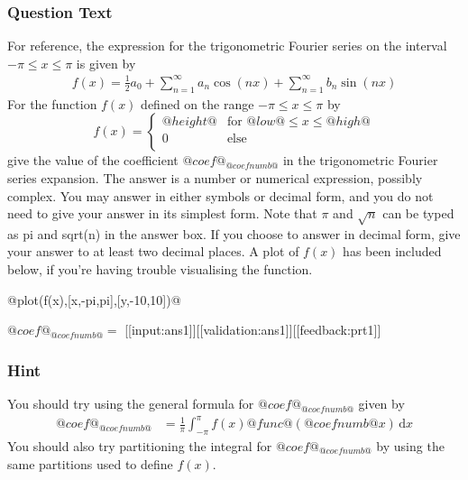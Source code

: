 \documentclass[a4paper,10pt]{article}
\begin{document}
\subsubsection{Question Text}
For reference, the expression for the trigonometric Fourier series on the interval $-\pi \leq x \leq \pi$ is given by \begin{align*}
f(x) = \frac{1}{2}a_0 + \sum_{n=1}^{\infty}a_n\cos(nx) + \sum_{n=1}^{\infty}b_n\sin(nx)
\end{align*}
For the function \(f(x)\) defined on the range \(-\pi \leq x \leq \pi\) by \[ f(x) = \begin{cases} @height@ & \text{for } @low@ \leq x \leq @high@\\ 0 & \text{else} \\ \end{cases} \] give the value of the coefficient \(@coef@_{@coefnumb@}\) in the trigonometric Fourier series expansion. The answer is a number or numerical expression, possibly complex. You may answer in either symbols or decimal form, and you do not need to give your answer in its simplest form. Note that \(\pi\) and \(\sqrt{n}\) can be typed as pi and sqrt(n) in the answer box. If you choose to answer in decimal form, give your answer to at least two decimal places. A plot of \(f(x)\) has been included below, if you're having trouble visualising the function.

@plot(f(x),[x,-pi,pi],[y,-10,10])@

$@coef@_{@coefnumb@} = $ [[input:ans1]][[validation:ans1]][[feedback:prt1]]
\subsubsection{Hint}
You should try using the general formula for \(@coef@_{@coefnumb@}\) given by \begin{align*} @coef@_{@coefnumb@} &= \frac{1}{\pi} \int_{-\pi}^{\pi} f(x)@func@(@coefnumb@x) \, \text{d}x \end{align*} You should also try partitioning the integral for \(@coef@_{@coefnumb@}\) by using the same partitions used to define $f(x)$.
\end{document}
